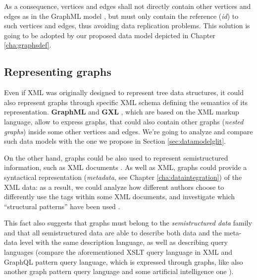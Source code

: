 As a consequence, vertices and edges shall not directly contain other vertices and edges as in the GraphML model  \cite{graphml}, but must only contain the reference (\textit{id}) to such vertices and edges, thus avoiding data replication problems. This solution is going to be adopted by our proposed data model depicted in Chapter \ref{cha:graphsdef}.


\subsection{Representing graphs}
Even if XML was originally designed to represent tree data structures, it could also  represent graphs through specific XML schema defining the semantics of its representation. \textbf{GraphML} \cite{graphml} and \textbf{GXL} \cite{gxlgraphml}, which are based on the XML markup language, allow to express graphs, that could also contain other graphs (\textit{nested graphs}) inside some other vertices and edges. We're going to analyze and compare such data models with the one we propose in Section \vref{sec:datamodelglit}.


On the other hand, graphs could be also used to represent semistructured information, such as XML documents \cite{Lassila1999,GutierrezInclusion}. As well as XML, graphs could provide a syntactical representation (\textit{metadata}, see Chapter \ref{cha:dataintegration}) of the XML data: as a result, we could analyze how different authors choose to differently use the tags within some XML documents, and investigate which ``structural patterns'' have been used \cite{IorioHierarchy,BarabucciEARMARK}. 

This fact also suggests that graphs must belong to the \textit{semistructured data} family and that all semistructured data are able to describe both data and the meta-data level with the same description language, as well as describing query languages (compare the aforementioned XSLT query language in XML and GraphQL \cite{GraphLogAggr} pattern query language, which is expressed through graphs, like also another graph pattern query language \cite{n3} and some artificial intelligence one \cite{Goertzel2014}).

\medskip